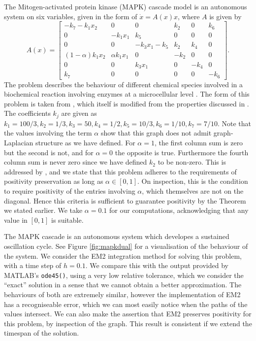 The Mitogen-activated protein kinase (MAPK) cascade model is an autonomous system on six variables,
given in the form of $\dot{x} = A(x)x$, where $A$ is given by
\begin{equation*}
    A(x) = \begin{bmatrix}
        -k_7 - k_1 x_2      & 0              & 0            & k_2  & 0    & k_6 \\
        0                   & -k_1 x_1       & k_5          & 0    & 0    & 0 \\
        0                   & 0              & -k_3 x_1-k_5 & k_2  & k_4  & 0 \\
        (1 - \alpha)k_1 x_2 & \alpha k_1 x_1 & 0            & -k_2 & 0    & 0 \\
        0                   & 0              & k_3 x_1      & 0    & -k_4 & 0 \\
        k_7                 & 0              & 0            & 0    & 0    & -k_6
    \end{bmatrix}.
\end{equation*}
The problem describes the behaviour of different chemical species involved in a biochemical reaction involving enzymes at a microcellular level \cite{hadavc2017mapk}. 
The form of this problem is taken from \cite{blanes_pos_2022}, which itself is modified from the properties discussed in \cite{hadavc2017mapk}.
The coefficients $k_j$ are given as $k_1 = 100/3, k_2 = 1/3, k_3 = 50, k_4 = 1/2, k_5 = 10/3, k_6 = 1/10, k_7 = 7/10$.
Note that the values involving the term $\alpha$ show that this graph does not admit graph-Laplacian structure as we have defined.
For $\alpha = 1$, the first column sum is zero but the second is not,
and for $\alpha = 0$ the opposite is true.
Furthermore the fourth column sum is never zero since we have defined $k_2$ to be non-zero.
This is addressed by \cite{blanes_pos_2022}, and we state that this problem adheres to the requirements of positivity preservation as long as $\alpha \in [0,1]$.
On inspection, this is the condition to require positivity of the entries involving $\alpha$, which themselves are not on the diagonal.
Hence this criteria is sufficient to guarantee positivity by the Theorem we stated earlier.
We take $\alpha = 0.1$ for our computations, acknowledging that any value in $[0,1]$ is suitable.

The MAPK cascade is an autonomous system which developes a sustained oscillation cycle.
See Figure \ref{fig:mapkdual} for a visualisation of the behaviour of the system.
We consider the EM2 integration method for solving this problem, with a time step of $h=0.1$.
We compare this with the output provided by MATLAB's \texttt{ode45()}, using a very low relative tolerance, which we consider the ``exact'' solution in a sense that we cannot obtain a better approximation.
The behaviours of both are extremely similar, however the implementation of EM2 has a recogniseable error, which we can most easily notice when the paths of the values intersect.
We can also make the assertion that EM2 preserves positivity for this problem, by inspection of the graph.
This result is consistent if we extend the timespan of the solution. 

